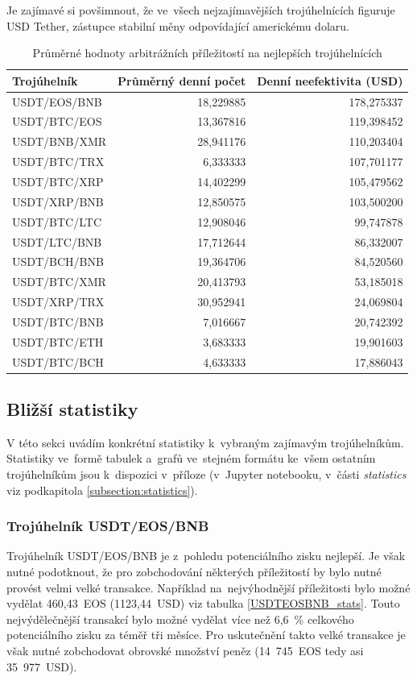 \documentclass[thesis=B,czech]{FITthesis}[2019/03/21]
\begin{document}
Je zajímavé si povšimnout, že ve~všech nejzajímavějších trojúhelnících figuruje USD Tether, zástupce stabilní měny odpovídající americkému dolaru.

\begin{table}\centering
\caption{Průměrné hodnoty arbitrážních příležitostí na nejlepších trojúhelnících}
\label{table_combined_best}
\begin{tabular}{|| l | r | r ||}\hline Trojúhelník & Průměrný denní počet & Denní neefektivita (USD)\\
 \hline
 \hline USDT/EOS/BNB & 18,229885 & 178,275337\\ 
 \hline USDT/BTC/EOS & 13,367816 & 119,398452\\ 
 \hline USDT/BNB/XMR & 28,941176 & 110,203404\\ 
 \hline USDT/BTC/TRX & 6,333333 & 107,701177\\ 
 \hline USDT/BTC/XRP & 14,402299 & 105,479562\\ 
 \hline USDT/XRP/BNB & 12,850575 & 103,500200\\ 
 \hline USDT/BTC/LTC & 12,908046 & 99,747878\\ 
 \hline USDT/LTC/BNB & 17,712644 & 86,332007\\ 
 \hline USDT/BCH/BNB & 19,364706 & 84,520560\\ 
 \hline USDT/BTC/XMR & 20,413793 & 53,185018\\ 
 \hline USDT/XRP/TRX & 30,952941 & 24,069804\\ 
 \hline USDT/BTC/BNB & 7,016667 & 20,742392\\ 
 \hline USDT/BTC/ETH & 3,683333 & 19,901603\\ 
 \hline USDT/BTC/BCH & 4,633333 & 17,886043\\ 
 \hline
\end{tabular}
\end{table}

\subsection{Bližší statistiky}
V této sekci uvádím konkrétní statistiky k~vybraným zajímavým trojúhelníkům. Statistiky ve~formě tabulek a~grafů ve~stejném formátu ke~všem ostatním trojúhelníkům jsou k~dispozici v~příloze (v~Jupyter notebooku, v~části \textit{statistics} viz podkapitola \ref{subsection:statistics}).

\subsubsection{Trojúhelník USDT/EOS/BNB}
Trojúhelník USDT/EOS/BNB je z~pohledu potenciálního zisku nejlepší. Je však nutné podotknout, že pro zobchodování některých příležitostí by bylo nutné provést velmi velké transakce. Například na~nejvýhodnější příležitosti bylo možné vydělat 460,43~EOS (1123,44~USD) viz tabulka \ref{USDTEOSBNB_stats}. Touto nejvýdělečnější transakcí bylo možné vydělat více než 6,6~\% celkového potenciálního zisku za téměř tři měsíce. Pro uskutečnění takto velké transakce je však nutné zobchodovat obrovské množství peněz (14~745~EOS tedy asi 35~977~USD).
\end{document}
